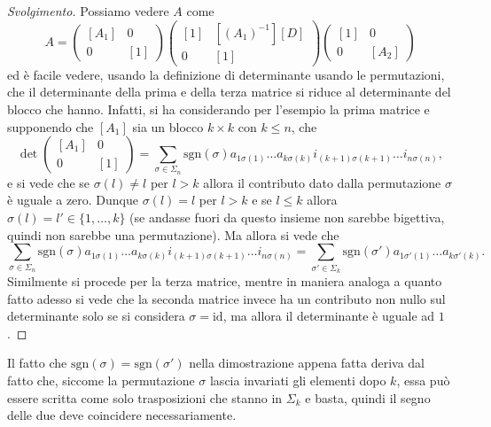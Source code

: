 \begin{proof}[Svolgimento]
    Possiamo vedere $A$ come
    $$
        A = \begin{pmatrix}
            [A_1] & 0 \\
            0 & [1]
        \end{pmatrix} \begin{pmatrix}
            [1] & [(A_1)^{-1}][D] \\
            0 & [1]
        \end{pmatrix} \begin{pmatrix}
            [1] & 0 \\
            0 & [A_2]
        \end{pmatrix} 
    $$
    ed è facile vedere, usando la definizione di determinante usando le permutazioni, che il determinante della prima e della terza matrice si riduce al determinante del blocco che hanno. Infatti, si ha considerando per l'esempio la prima matrice e supponendo che $[A_1]$ sia un blocco $k \times k$ con $k \leq n$, che
    $$
        \det{\begin{pmatrix}
            [A_1] & 0 \\
            0 & [1]
        \end{pmatrix}} = \sum_{\sigma \in \Sigma_n} \text{sgn}(\sigma) a_{1\sigma(1)} \ldots a_{k\sigma(k)} i_{(k+1)\sigma(k+1)} \ldots i_{n \sigma(n)},
    $$
    e si vede che se $\sigma(l) \neq l$ per $l > k$ allora il contributo dato dalla permutazione $\sigma$ è uguale a zero. Dunque $\sigma(l) = l$ per $l > k$ e se $l \leq k$ allora $\sigma(l) = l' \in \{ 1, \ldots, k \}$ (se andasse fuori da questo insieme non sarebbe bigettiva, quindi non sarebbe una permutazione). Ma allora
    si vede che
    $$
        \sum_{\sigma \in \Sigma_n} \text{sgn}(\sigma) a_{1\sigma(1)} \ldots a_{k\sigma(k)} i_{(k+1)\sigma(k+1)} \ldots i_{n \sigma(n)} = \sum_{\sigma' \in \Sigma_k} \text{sgn}(\sigma') a_{1 \sigma'(1)} \ldots a_{k \sigma'(k)}.
    $$
    Similmente si procede per la terza matrice, mentre in maniera analoga a quanto fatto adesso si vede che la seconda matrice invece ha un contributo non nullo sul determinante solo se si considera $\sigma = \text{id}$, ma allora il determinante è uguale ad $1$.
\end{proof}
\begin{remark}
    Il fatto che $\text{sgn}(\sigma) = \text{sgn}(\sigma')$ nella dimostrazione appena fatta deriva dal fatto che, siccome la permutazione $\sigma$ lascia invariati gli elementi dopo $k$, essa può essere scritta come solo trasposizioni che stanno in $\Sigma_k$ e basta, quindi il segno delle due deve coincidere necessariamente.
\end{remark}
